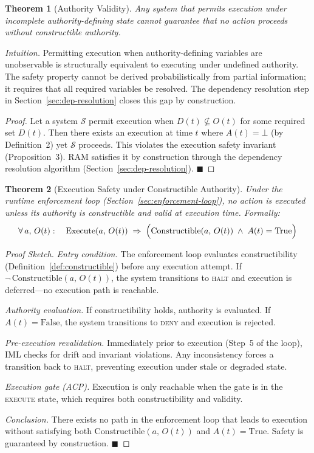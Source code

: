 \documentclass[11pt]{article}
\newtheorem{theorem}{Theorem}
\begin{document}
\begin{theorem}[Authority Validity]
\label{thm:validity}
Any system that permits execution under incomplete authority-defining state cannot
guarantee that no action proceeds without constructible authority.
\end{theorem}

\textit{Intuition.} Permitting execution when authority-defining variables are unobservable
is structurally equivalent to executing under undefined authority. The safety property
cannot be derived probabilistically from partial information; it requires that all required
variables be resolved. The dependency resolution step in Section~\ref{sec:dep-resolution}
closes this gap by construction.

\begin{proof}
Let a system $\mathcal{S}$ permit execution when $D(t) \not\subseteq O(t)$ for some
required set $D(t)$. Then there exists an execution at time $t$ where $A(t) = \bot$ (by
Definition~2) yet $\mathcal{S}$ proceeds. This violates the execution safety invariant
(Proposition~3). RAM satisfies it by construction through the dependency resolution
algorithm (Section~\ref{sec:dep-resolution}). \hfill $\blacksquare$
\end{proof}

\begin{theorem}[Execution Safety under Constructible Authority]
\label{thm:safety}
Under the runtime enforcement loop (Section~\ref{sec:enforcement-loop}), no action is
executed unless its authority is constructible and valid at execution time. Formally:
\[
  \forall\, a,\, O(t):\quad
  \mathrm{Execute}(a,\,O(t)) \;\Rightarrow\;
  \Bigl(\mathrm{Constructible}(a,\,O(t)) \;\land\; A(t) = \mathrm{True}\Bigr)
\]
\end{theorem}

\begin{proof}[Proof Sketch]
\textit{Entry condition.} The enforcement loop evaluates constructibility
(Definition~\ref{def:constructible}) before any execution attempt. If
$\lnot\,\mathrm{Constructible}(a,\,O(t))$, the system transitions to \textsc{halt}
and execution is deferred---no execution path is reachable.

\textit{Authority evaluation.} If constructibility holds, authority is evaluated. If
$A(t) = \mathrm{False}$, the system transitions to \textsc{deny} and execution is
rejected.

\textit{Pre-execution revalidation.} Immediately prior to execution (Step~5 of the
loop), IML checks for drift and invariant violations. Any inconsistency forces a
transition back to \textsc{halt}, preventing execution under stale or degraded state.

\textit{Execution gate (ACP).} Execution is only reachable when the gate is in the
\textsc{execute} state, which requires both constructibility and validity.

\textit{Conclusion.} There exists no path in the enforcement loop that leads to
execution without satisfying both $\mathrm{Constructible}(a,\,O(t))$ and
$A(t) = \mathrm{True}$. Safety is guaranteed by construction. \hfill $\blacksquare$
\end{proof}
\end{document}

